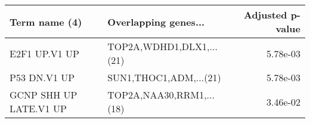 \begin{tabular}{llr}
\toprule
         Term name (4) &     Overlapping genes... &  Adjusted p-value \\
\midrule
         E2F1 UP.V1 UP & TOP2A,WDHD1,DLX1,...(21) &          5.78e-03 \\
          P53 DN.V1 UP &   SUN1,THOC1,ADM,...(21) &          5.78e-03 \\
GCNP SHH UP LATE.V1 UP & TOP2A,NAA30,RRM1,...(18) &          3.46e-02 \\
\bottomrule
\end{tabular}
